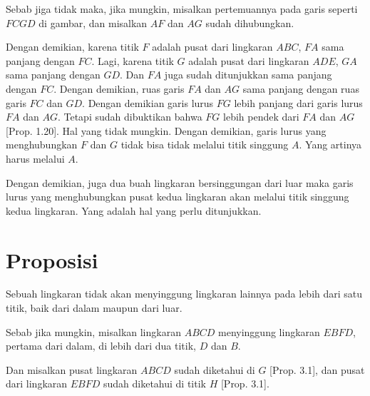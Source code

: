 \documentclass[a4paper]{book}
\begin{document}
Sebab jiga tidak maka, jika mungkin, misalkan pertemuannya pada garis 
seperti $FCGD$ di gambar, dan misalkan $AF$ dan $AG$ sudah dihubungkan.

Dengan demikian, karena titik $F$ adalah pusat dari lingkaran $ABC$, 
$FA$  sama panjang dengan $FC$. Lagi, karena titik $G$ adalah pusat dari
lingkaran $ADE$, $GA$ sama panjang dengan $GD$. Dan $FA$ juga sudah
ditunjukkan sama panjang dengan $FC$. Dengan demikian, ruas garis $FA$
dan $AG$ sama panjang dengan ruas garis $FC$ dan $GD$. Dengan demikian
garis lurus $FG$ lebih panjang dari garis lurus $FA$ dan $AG$. Tetapi 
sudah dibuktikan bahwa $FG$ lebih pendek dari $FA$ dan $AG$ [Prop. 1.20].
Hal yang tidak mungkin. Dengan demikian, garis lurus  yang menghubungkan
$F$ dan $G$ tidak bisa tidak melalui titik singgung $A$. Yang artinya
harus melalui $A$.

Dengan demikian, juga dua buah lingkaran bersinggungan dari luar 
maka garis lurus yang menghubungkan pusat kedua lingkaran akan melalui
titik singgung kedua lingkaran. Yang adalah hal yang perlu ditunjukkan.

\section*{\centering Proposisi \thesection}
Sebuah lingkaran tidak akan menyinggung lingkaran lainnya pada lebih dari
satu titik, baik dari dalam maupun dari luar.  
\begin{center}
\end{center}

Sebab jika mungkin, misalkan lingkaran $ABCD$ menyinggung lingkaran 
$EBFD$, pertama dari dalam, di lebih dari dua titik, $D$ dan $B$.

Dan misalkan pusat lingkaran $ABCD$ sudah diketahui di  $G$ [Prop. 3.1],
dan pusat dari lingkaran $EBFD$ sudah diketahui di titik $H$ [Prop. 3.1].
\end{document}
